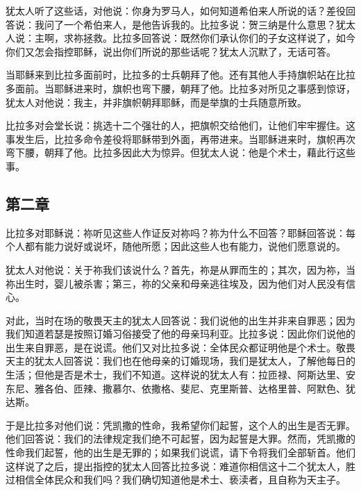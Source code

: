 犹太人听了这些话，对他说：你身为罗马人，如何知道希伯来人所说的话？差役回答说：我问了一个希伯来人，是他告诉我的。比拉多说：贺三纳是什么意思？犹太人说：主啊，求祢拯救。比拉多回答说：既然你们承认你们的子女这样说了，如今你们又怎会指控耶稣，说出你们所说的那些话呢？犹太人沉默了，无话可答。\par

当耶稣来到比拉多面前时，比拉多的士兵朝拜了他。还有其他人手持旗帜站在比拉多面前。当耶稣进来时，旗帜也弯下腰，朝拜了他。比拉多对所见之事感到惊讶，犹太人对他说：我主，并非旗帜朝拜耶稣，而是举旗的士兵随意所致。\par

比拉多对会堂长说：挑选十二个强壮的人，把旗帜交给他们，让他们牢牢握住。这事发生后，比拉多命令差役将耶稣带到外面，再带进来。当耶稣进来时，旗帜再次弯下腰，朝拜了他。比拉多因此大为惊异。但犹太人说：他是个术士，藉此行这些事。\par


\subsection{第二章}

比拉多对耶稣说：祢听见这些人作证反对祢吗？祢为什么不回答？耶稣回答说：每个人都有能力说好或说坏，随他所愿；因此这些人也有能力，说他们愿意说的。\par

犹太人对他说：关于祢我们该说什么？首先，祢是从罪而生的；其次，因为祢，当祢出生时，婴儿被杀害；第三，祢的父亲和母亲逃往埃及，因为他们对人民没有信心。\par

对此，当时在场的敬畏天主的犹太人回答说：我们说他的出生并非来自罪恶；因为我们知道若瑟是按照订婚习俗接受了他的母亲玛利亚。比拉多说：因此你们说他的出生来自罪恶，是在说谎。他们又对比拉多说：全体民众都证明他是个术士。敬畏天主的犹太人回答说：我们也在他母亲的订婚现场，我们是犹太人，了解他每日的生活；但他是否是术士，我们不知道。这样说的犹太人有：拉匝禄、阿斯达里、安东尼、雅各伯、匝辣、撒慕尔、依撒格、斐尼、克里斯普、达格里普、阿默色、犹达斯。\par

于是比拉多对他们说：凭凯撒的性命，我希望你们起誓，这个人的出生是否无罪。他们回答说：我们的法律规定我们绝不可起誓，因为起誓是大罪。然而，凭凯撒的性命我们起誓，他的出生是无罪的；如果我们说谎，请下令将我们全部斩首。他们这样说了之后，提出指控的犹太人回答比拉多说：难道你相信这十二个犹太人，胜过相信全体民众和我们吗？我们确切知道他是术士、亵渎者，且自称为天主子。\par


